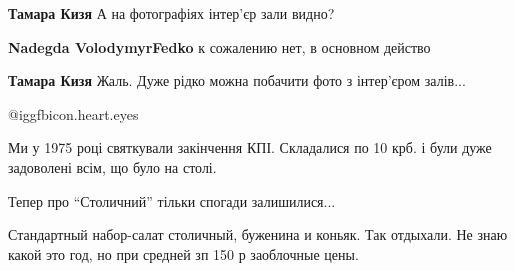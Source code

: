 \begin{itemize}
\begin{itemize} %
\textbf{Тамара Кизя} А на фотографіях інтер'єр зали видно?

\textbf{Nadegda VolodymyrFedko} к сожалению нет, в основном действо

\textbf{Тамара Кизя} Жаль. Дуже рідко можна побачити фото з інтер'єром залів...
\end{itemize} %

 @igg{fbicon.heart.eyes} 


Ми у 1975 році святкували закінчення КПІ. Складалися по 10 крб. і були дуже
задоволені всім, що було на столі.

Тепер про \enquote{Столичний} тільки спогади залишилися...



Стандартный набор-салат столичный, буженина и коньяк. Так отдыхали. Не знаю
какой это год, но при средней зп 150 р заоблочные цены.


\end{itemize} %
